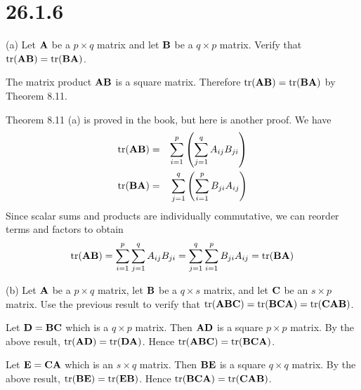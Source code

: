 \section*{26.1.6}
(a) Let $\bf A$ be a $p\times q$ matrix and let $\bf B$ be a
$q\times p$ matrix. Verify that
$\mathop{\rm tr}({\bf AB})=\mathop{\rm tr}({\bf BA})$.

\bigskip
\noindent
The matrix product $\bf AB$ is a square matrix.
Therefore $\mathop{\rm tr}({\bf AB})=\mathop{\rm tr}({\bf BA})$
by Theorem 8.11.

\bigskip
\noindent
Theorem 8.11 (a) is proved in the book, but here is another proof.
We have
\begin{eqnarray*}
\mathop{\rm tr}({\bf AB})&=&\sum_{i=1}^p
\left(\sum_{j=1}^q A_{ij}B_{ji}\right)\\
\mathop{\rm tr}({\bf BA})&=&\sum_{j=1}^q
\left(\sum_{i=1}^p B_{ji}A_{ij}\right)
\end{eqnarray*}
Since scalar sums and products are individually commutative,
we can reorder terms and factors to obtain
$$\mathop{\rm tr}({\bf AB})=\sum_{i=1}^p\sum_{j=1}^q A_{ij}B_{ji}
=\sum_{j=1}^q\sum_{i=1}^p B_{ji}A_{ij}
=\mathop{\rm tr}({\bf BA})$$

\bigskip
\noindent
(b) Let $\bf A$ be a $p\times q$ matrix, let $\bf B$ be a
$q\times s$ matrix, and let $\bf C$ be an $s\times p$ matrix.
Use the previous result to verify that
$\mathop{\rm tr}({\bf ABC})=\mathop{\rm tr}({\bf BCA})
=\mathop{\rm tr}({\bf CAB})$.

\bigskip
\noindent
Let $\bf D=BC$ which is a $q\times p$ matrix.
Then $\bf AD$ is a square $p\times p$ matrix.
By the above result, $\mathop{\rm tr}({\bf AD})=\mathop{\rm tr}({\bf DA})$.
Hence $\mathop{\rm tr}({\bf ABC})=\mathop{\rm tr}({\bf BCA})$.

\bigskip
\noindent
Let $\bf E=CA$ which is an $s\times q$ matrix.
Then $\bf BE$ is a square $q\times q$ matrix.
By the above result, $\mathop{\rm tr}({\bf BE})=\mathop{\rm tr}({\bf EB})$.
Hence $\mathop{\rm tr}({\bf BCA})=\mathop{\rm tr}({\bf CAB})$.
